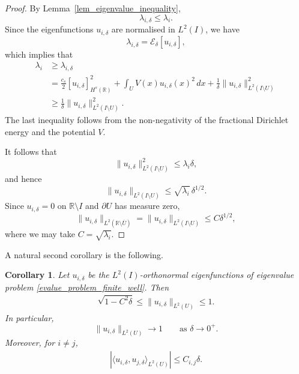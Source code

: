 \documentclass[preprint,12pt]{elsarticle}
\newcommand{\R}{\mathbb R}
\newtheorem{corollary}[theorem]{Corollary}
\begin{document}
\begin{proof}
By Lemma~\ref{lem_eigenvalue_inequality},
\[
    \lambda_{i,\delta}\leq\lambda_i.
\]
Since the eigenfunctions $u_{i,\delta}$ are normalised in $L^2(I)$,
we have
\[
    \lambda_{i,\delta}
    =
    \mathcal E_\delta[u_{i,\delta}],
\]
which implies that
\begin{align*}
    \lambda_i
    &\geq \lambda_{i,\delta}\\
    &=
    \frac{c_s}{2}
    [u_{i,\delta}]_{H^s(\R)}^2
    +
    \int_U V(x)u_{i,\delta}(x)^2\,dx
    +
    \frac{1}{\delta}
    \|u_{i,\delta}\|_{L^2(I\setminus U)}^2\\
    &\geq
    \frac{1}{\delta}
    \|u_{i,\delta}\|_{L^2(I\setminus U)}^2.
\end{align*}
The last inequality follows from the non-negativity of the fractional Dirichlet energy and the potential $V$.

It follows that
\[
    \|u_{i,\delta}\|_{L^2(I\setminus U)}^2
    \leq
    \lambda_i\delta,
\]
and hence
\[
    \|u_{i,\delta}\|_{L^2(I\setminus U)}
    \leq
    \sqrt{\lambda_i}\,\delta^{1/2}.
\]
Since $u_{i,\delta}=0$ on $\R\setminus I$ and $\partial U$ has
measure zero,
\[
    \|u_{i,\delta}\|_{L^2(\R\setminus\overline U)}
    =
    \|u_{i,\delta}\|_{L^2(I\setminus U)}
    \leq
    C\delta^{1/2},
\]
where we may take $C=\sqrt{\lambda_i}$.
\end{proof}

\noindent A natural second corollary is the following.
\begin{corollary}\label{asymptotic_norm_orthogonality_U}
Let $u_{i,\delta}$ be the $L^2(I)$-orthonormal eigenfunctions of
eigenvalue problem \eqref{evalue_problem_finite_well}. Then
\begin{align}\label{L2_norm_on_U}
    \sqrt{1-C^2\delta}
    \leq
    \|u_{i,\delta}\|_{L^2(U)}
    \leq1.
\end{align}
In particular,
\[
    \|u_{i,\delta}\|_{L^2(U)}
    \longrightarrow1
    \qquad\text{as }\delta\to0^+.
\]
Moreover, for $i\neq j$,
\begin{align}\label{asymptotic_orthogonality_U}
    \left|
    \langle u_{i,\delta},u_{j,\delta}\rangle_{L^2(U)}
    \right|
    \leq C_{i,j}\delta.
\end{align}
\end{corollary}
\end{document}
